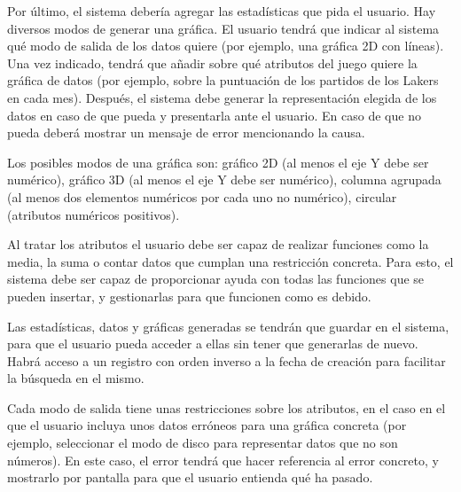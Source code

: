 Por último, el sistema debería agregar las estadísticas que pida el usuario. Hay diversos modos de generar una gráfica. El usuario tendrá que indicar al sistema qué modo de salida de los datos quiere (por ejemplo, una gráfica 2D con líneas). Una vez indicado, tendrá que añadir sobre qué atributos del juego quiere la gráfica de datos (por ejemplo, sobre la puntuación de los partidos de los Lakers en cada mes). Después, el sistema debe generar la representación elegida de los datos en caso de que pueda y presentarla ante el usuario. En caso de que no pueda deberá mostrar un mensaje de error mencionando la causa.

Los posibles modos de una gráfica son: gráfico 2D (al menos el eje Y debe ser numérico), gráfico 3D (al menos el eje Y debe ser numérico), columna agrupada (al menos dos elementos numéricos por cada uno no numérico), circular (atributos numéricos positivos).

Al tratar los atributos el usuario debe ser capaz de realizar funciones como la media, la suma o contar datos que cumplan una restricción concreta. Para esto, el sistema debe ser capaz de proporcionar ayuda con todas las funciones que se pueden insertar, y gestionarlas para que funcionen como es debido.


Las estadísticas, datos y gráficas generadas se tendrán que guardar en el sistema, para que el usuario pueda acceder a ellas sin tener que generarlas de nuevo. Habrá acceso a un registro con orden inverso a la fecha de creación para facilitar la búsqueda en el mismo.

Cada modo de salida tiene unas restricciones sobre los atributos, en el caso en el que el usuario incluya unos datos erróneos para una gráfica concreta (por ejemplo, seleccionar el modo de disco para representar datos que no son números). En este caso, el error tendrá que hacer referencia al error concreto, y mostrarlo por pantalla para que el usuario entienda qué ha pasado. 
